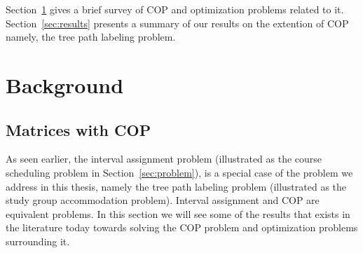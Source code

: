 \documentclass[MS,synopsis]{iitmdiss}
\def \un {\bf 1}
\begin{document}
Section~\ref{sec:background} gives a brief survey of COP and
optimization problems related to it.  Section~\ref{sec:results}
presents a summary of our results on the extention of COP namely, the
tree path labeling problem. 


\section{Background}
\label{sec:background}
\subsection{Matrices with COP}
\label{sec:copmatrices}
As seen earlier, the interval assignment problem (illustrated as the
course scheduling problem in Section~\ref{sec:problem}), is a special
case of the problem we address in this thesis, namely the tree path
labeling problem (illustrated as the study group accommodation
problem). Interval assignment and COP are equivalent
problems. In this section we will see some of the results that
exists in the literature today towards solving the COP problem and
optimization problems surrounding it.

\end{document}
